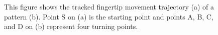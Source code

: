     \begin{figure}[!t]
        \centering
        \hspace{0.2cm}
        \caption{This figure shows the tracked fingertip movement trajectory (a) of a pattern (b). Point S on (a) is the starting point and points A, B, C, and D on (b) represent four turning points.}
        \label{fig:fig6}
    \end{figure}

